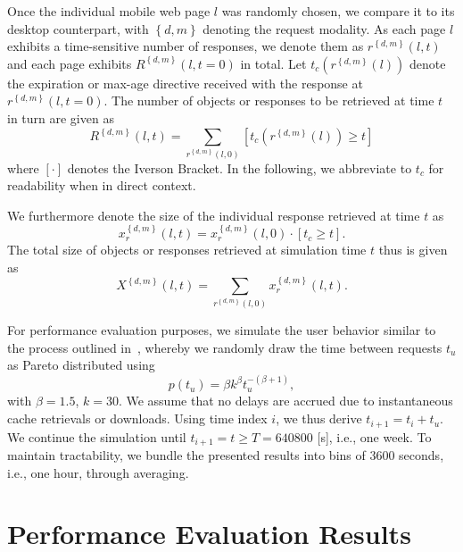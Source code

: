 Once the individual mobile web page $l$ was randomly chosen, we compare it to its desktop counterpart, with $\left\{ d,m \right\}$ denoting the request modality.
As each page $l$ exhibits a time-sensitive number of responses, we denote them as $r^{\left\{ d,m \right\}}(l,t)$ and each page exhibits $R^{\left\{ d,m \right\}}(l,t=0)$ in total.
Let $t_c(r^{\left\{ d,m \right\}}(l))$ denote the expiration or max-age directive received with the response at $r^{\left\{ d,m \right\}}(l,t=0)$.
The number of objects or responses to be retrieved at time $t$ in turn are given as 
\begin{equation}
R^{\left\{ d,m \right\}}(l,t) = \sum_{r^{\left\{ d,m \right\}}(l,0)} \left[ t_c(r^{\left\{ d,m \right\}}(l)) \ge t \right]
\end{equation}
where $\left[ \cdot \right] $ denotes the Iverson Bracket.
In the following, we abbreviate to $t_c$ for readability when in direct context.

We furthermore denote the size of the individual response retrieved at time $t$ as 
\begin{equation}
x_{r}^{\left\{ d,m \right\}}(l,t) = x_{r}^{\left\{ d,m \right\}}(l,0) \cdot \left[ t_c \ge t \right].
\end{equation}
The total size of objects or responses retrieved at simulation time $t$ thus is given as 
\begin{equation}
X^{\left\{ d,m \right\}}(l,t) =\sum_{r^{\left\{ d,m \right\}}(l,0)} x_{r}^{\left\{ d,m \right\}}(l,t).
\end{equation}


For performance evaluation purposes, we simulate the user behavior similar to the process outlined in~\cite{AnCoGrPa03}, whereby we randomly draw the time between requests $t_u$ as Pareto distributed using
\begin{equation}
p(t_u)=\beta k^\beta t_u^{-(\beta+1)},
\end{equation}
 with $\beta=1.5$, $k=30$.
We assume that no delays are accrued due to instantaneous cache retrievals or downloads. 
Using time index $i$, we thus derive $t_{i+1}=t_i + t_u$.
We continue the simulation until $t_{i+1} = t \ge T =  640800$ [s], i.e., one week.
To maintain tractability, we bundle the presented results into bins of 3600 seconds, i.e., one hour, through averaging.

\section*{Performance Evaluation Results}
\label{s:results}

